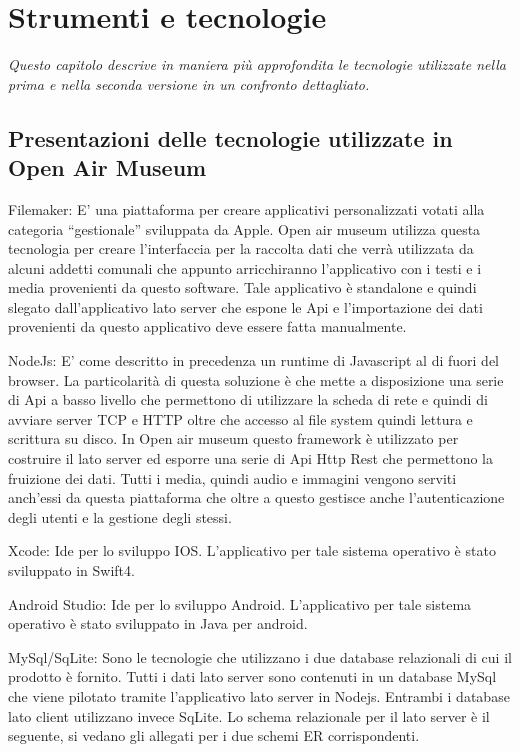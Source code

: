\chapter{Strumenti e tecnologie}
\label{cha:intro}
\vspace{5mm}

\emph{Questo capitolo descrive in maniera più approfondita le tecnologie utilizzate nella prima e nella seconda versione in un confronto dettagliato.}

\section{Presentazioni delle tecnologie utilizzate in Open Air Museum}\vspace{5mm}
Filemaker: E’ una piattaforma per creare applicativi personalizzati votati alla categoria “gestionale” sviluppata da Apple. Open air museum utilizza questa tecnologia per creare l’interfaccia per la raccolta dati che verrà utilizzata da alcuni addetti comunali che appunto arricchiranno l’applicativo con i testi e i media provenienti da questo software. Tale applicativo è standalone e quindi slegato dall’applicativo lato server che espone le Api e l’importazione dei dati provenienti da questo applicativo deve essere fatta manualmente.\vspace{5mm}

	NodeJs: E’ come descritto in precedenza un runtime di Javascript al di fuori del browser. La particolarità di questa soluzione è che mette a disposizione una serie di Api a basso livello che permettono di utilizzare la scheda di rete e quindi di avviare server TCP e HTTP oltre che accesso al file system quindi lettura e scrittura su disco. In Open air museum questo framework è utilizzato per costruire il lato server ed esporre una serie di Api Http Rest che permettono la fruizione dei dati. Tutti i media, quindi audio e immagini vengono serviti anch’essi da questa piattaforma che oltre a questo gestisce anche l’autenticazione degli utenti e la gestione degli stessi.\vspace{5mm}

	Xcode: Ide per lo sviluppo IOS. L’applicativo per tale sistema operativo è stato sviluppato in Swift4.\vspace{5mm}

	Android Studio: Ide per lo sviluppo Android. L’applicativo per tale sistema operativo è stato sviluppato in Java per android.\vspace{5mm}

	MySql/SqLite: Sono le tecnologie che utilizzano i due database relazionali di cui il prodotto è fornito. Tutti i dati lato server sono contenuti in un database MySql che viene pilotato tramite l’applicativo lato server in Nodejs. Entrambi i database lato client utilizzano invece SqLite. Lo schema relazionale per il lato server è il seguente, si vedano gli allegati per i due schemi ER corrispondenti.

